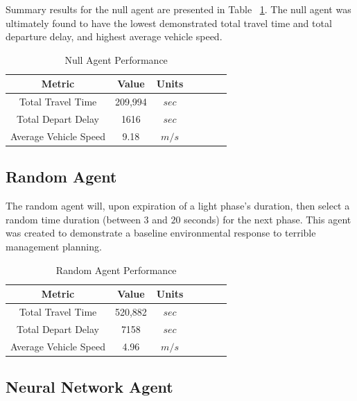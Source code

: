 \documentclass[twocolumn]{article}
\begin{document}
Summary results for the null agent are presented in Table ~\ref{tab:null_agent_perf}. The null agent was ultimately found to have the lowest demonstrated total travel time and total departure delay, and highest average vehicle speed.

\begin{table}[H]
    \centering
    \begin{tabular}{|c|c|c|c|c|c|c|}
        \hline
         Metric & Value & Units \\
        \hline\hline
        Total Travel Time & 209,994 & $sec$ \\
        \hline
        Total Depart Delay & 1616 & $sec$ \\
        \hline
        Average Vehicle Speed & 9.18 & $m/s$ \\
        \hline
    \end{tabular}
    \caption{Null Agent Performance}
    \label{tab:null_agent_perf}
\end{table}

\subsection{Random Agent}

The random agent will, upon expiration of a light phase's duration, then select a random time duration (between $3$ and $20$ seconds) for the next phase. This agent was created to demonstrate a baseline environmental response to terrible management planning.

\begin{table}[H]
    \centering
    \begin{tabular}{|c|c|c|c|c|c|c|}
        \hline
         Metric & Value & Units \\
        \hline\hline
        Total Travel Time & 520,882 & $sec$ \\
        \hline
        Total Depart Delay & 7158 & $sec$ \\
        \hline
        Average Vehicle Speed & 4.96 & $m/s$ \\
        \hline
    \end{tabular}
    \caption{Random Agent Performance}
    \label{tab:random_agent_perf}
\end{table}

\subsection{Neural Network Agent}
\end{document}
